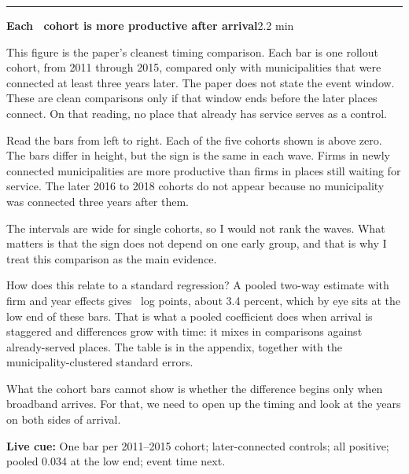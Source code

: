 \documentclass[11pt]{article}
\newcommand{\Cue}[1]{\par\nobreak\smallskip\noindent\textcolor{ScriptGray}{\footnotesize
  \textbf{Live cue:} #1}\par}
\newcommand{\scriptframe}[3]{%
  \Needspace{11\baselineskip}%
  \par\medskip\noindent\textcolor{ScriptBlue}{\rule{\linewidth}{0.55pt}}%
  \par\smallskip\noindent
  \textbf{#1}\hfill\textcolor{ScriptGray}{\small #2}\par\smallskip
  #3\par}
\begin{document}
\scriptframe{Each \ResCohortYears\ cohort is more productive after arrival}{2.2 min}{%
  This figure is the paper's cleanest timing comparison. Each bar is one
  rollout cohort, from 2011 through 2015, compared only with municipalities
  that were connected at least three years later. The paper does not state the
  event window. These are clean comparisons only if that window ends before
  the later places connect. On that reading, no place that already has
  service serves as a control.

  Read the bars from left to right. Each of the five cohorts shown is above
  zero. The bars differ in height, but the sign is the same in each wave. Firms in newly
  connected municipalities are more productive than firms in places still
  waiting for service. The
  later 2016 to 2018 cohorts do not appear because no municipality was
  connected three years after them.

  The intervals are wide for single cohorts, so I would not rank the waves.
  What matters is that the sign does not depend on one early group, and that
  is why I treat this comparison as the main evidence.

  How does this relate to a standard regression? A pooled two-way estimate
  with firm and year effects gives \ResBaseline\ log points, about 3.4
  percent, which by eye sits at the low end of these bars. That is what a pooled
  coefficient does when arrival is staggered and differences grow with time:
  it mixes in comparisons against already-served places. The table is in the
  appendix, together with the municipality-clustered standard errors.

  What the cohort bars cannot show is whether the difference begins only when
  broadband arrives. For that, we need to open up the timing and look at the
  years on both sides of arrival.
  \Cue{One bar per 2011--2015 cohort; later-connected controls; all positive; pooled 0.034 at the low end; event time next.}
}
\end{document}
